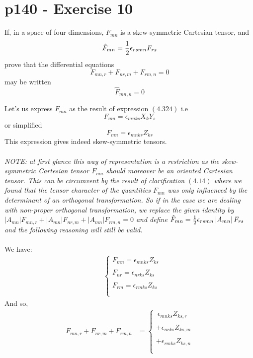 \section{p140 - Exercise 10}
\begin{tcolorbox}
If, in a space of four dimensions, $F_{mn}$ is a skew-symmetric Cartesian tensor, and $$\hat{F}_{mn} = \frac{1}{2} \epsilon_{rsmn} F_{rs}$$
prove that the differential equations $$ F_{mn,r}+F_{nr,m}+F_{rm,n}=0$$ may be written $$\hat{F}_{mn,n} =0$$
\end{tcolorbox}
Let's us express $F_{mn}$ as the result of expression $\mathbf{(4.324)} $ i.e $$F_{mn} = \epsilon_{mnks} X_kY_s$$ or simplified $$F_{mn} = \epsilon_{mnks} Z_{ks}$$
This expression gives indeed skew-symmetric tensors.\\\\
\textit{NOTE:  at first glance this way of representation is  a restriction as the  skew-symmetric Cartesian tensor $F_{mn}$ should moreover be an oriented Cartesian tensor. This can be circumvent by the result of clarification $\mathbf{(4.14)}$ where we found that the tensor character  of the quantities $F_{mn}$ was only influenced by the determinant of an orthogonal transformation. So if in the case we are dealing with non-proper orthogonal transformation,  we replace the given identity by   $ \left|A_{mn}\right|F_{mn,r}+\left|A_{mn}\right|F_{nr,m}+\left|A_{mn}\right|F_{rm,n}=0$ and define $\hat{F}_{mn} = \frac{1}{2} \epsilon_{rsmn}\left|A_{mn}\right| F_{rs}$ and the following reasoning will still be valid.}\\\\
 We have:
\begin{align}
&\left\{\begin{array}{l}
F_{mn} = \epsilon_{mnks} Z_{ks}\\\\
F_{nr} = \epsilon_{nrks} Z_{ks}\\\\
F_{rm} = \epsilon_{rmks} Z_{ks}\\\\
\end{array}\right.
\end{align}
And so, 
\begin{align}
F_{mn,r}+F_{nr,m}+F_{rm,n}&=\left\{\begin{array}{l}
\ \epsilon_{mnks} Z_{ks,r}\\\\
+\epsilon_{nrks} Z_{ks,m}\\\\
+\epsilon_{rmks} Z_{ks,n}\\\\
\end{array}\right.
\end{align}

